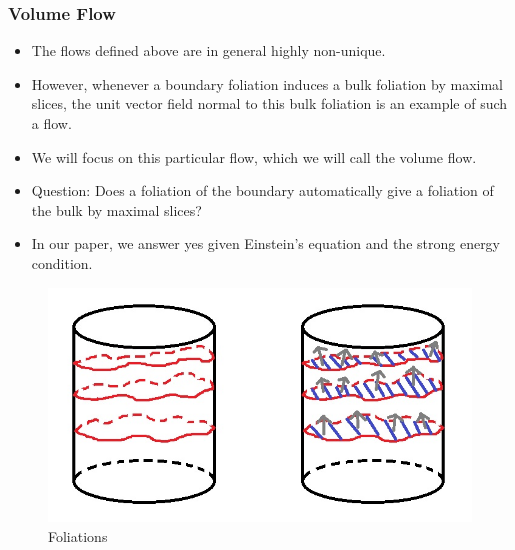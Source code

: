 \documentclass[8pt,aspectratio=169]{beamer}
\begin{document}
\begin{frame}
\frametitle{Volume Flow}

\begin{minipage}[t]{0.44\linewidth}

\begin{itemize}

\item The flows defined above are in general highly non-unique. 

\item However, whenever a boundary foliation induces a bulk foliation by maximal slices, the unit vector field normal to this bulk foliation is an example of such a flow. 

\item We will focus on this particular flow, which we will call the volume flow. 

\item Question: Does a foliation of the boundary automatically give a foliation of the bulk by maximal slices? 

\item In our paper, we answer yes given Einstein's equation and the strong energy condition.

\end{itemize}

\end{minipage}\hfill
%
\begin{minipage}[t]{0.55\linewidth}

\begin{figure}
    \begin{center}
    
        \includegraphics[scale=0.6]{ComplexityFlow}    
    
    \end{center}
    \caption{Foliations}
    \label{fig:WDW}
\end{figure}

\end{minipage}

\end{frame}
\end{document}
